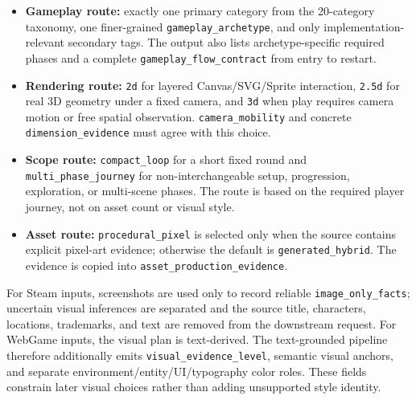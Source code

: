 \documentclass{article}
\begin{document}
\begin{itemize}[leftmargin=1.4em]
\item \textbf{Gameplay route:} exactly one primary category from the 20-category taxonomy, one finer-grained \texttt{gameplay\_archetype}, and only implementation-relevant secondary tags. The output also lists archetype-specific required phases and a complete \texttt{gameplay\_flow\_contract} from entry to restart.
\item \textbf{Rendering route:} \texttt{2d} for layered Canvas/SVG/Sprite interaction, \texttt{2.5d} for real 3D geometry under a fixed camera, and \texttt{3d} when play requires camera motion or free spatial observation. \texttt{camera\_mobility} and concrete \texttt{dimension\_evidence} must agree with this choice.
\item \textbf{Scope route:} \texttt{compact\_loop} for a short fixed round and \texttt{multi\_phase\_journey} for non-interchangeable setup, progression, exploration, or multi-scene phases. The route is based on the required player journey, not on asset count or visual style.
\item \textbf{Asset route:} \texttt{procedural\_pixel} is selected only when the source contains explicit pixel-art evidence; otherwise the default is \texttt{generated\_hybrid}. The evidence is copied into \texttt{asset\_production\_evidence}.
\end{itemize}

For Steam inputs, screenshots are used only to record reliable \texttt{image\_only\_facts}; uncertain visual inferences are separated and the source title, characters, locations, trademarks, and text are removed from the downstream request. For WebGame inputs, the visual plan is text-derived. The text-grounded pipeline therefore additionally emits \texttt{visual\_evidence\_level}, semantic visual anchors, and separate environment/entity/UI/typography color roles. These fields constrain later visual choices rather than adding unsupported style identity.
\end{document}
